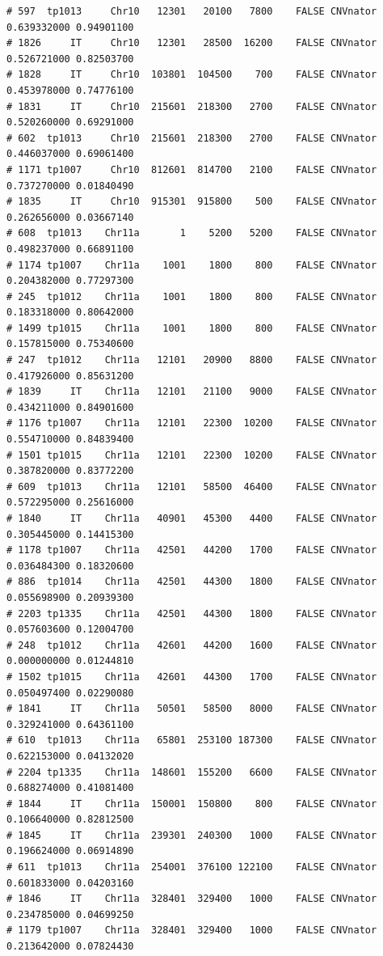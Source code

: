 \documentclass{article}\usepackage[]{graphicx}\usepackage[]{color}
\makeatletter
\newenvironment{kframe}{%
 \def\at@end@of@kframe{}%
 \ifinner\ifhmode%
  \def\at@end@of@kframe{\end{minipage}}%
  \begin{minipage}{\columnwidth}%
 \fi\fi%
 \def\FrameCommand##1{\hskip\@totalleftmargin \hskip-\fboxsep
 \colorbox{shadecolor}{##1}\hskip-\fboxsep
     \hskip-\linewidth \hskip-\@totalleftmargin \hskip\columnwidth}%
 \MakeFramed {\advance\hsize-\width
   \@totalleftmargin\z@ \linewidth\hsize
   \@setminipage}}%
 {\par\unskip\endMakeFramed%
 \at@end@of@kframe}
\newenvironment{knitrout}{}{} %
\makeatother
\begin{document}
\begin{knitrout}
\begin{kframe}
\begin{verbatim}
# 597  tp1013     Chr10   12301   20100   7800    FALSE CNVnator 0.639332000 0.94901100
# 1826     IT     Chr10   12301   28500  16200    FALSE CNVnator 0.526721000 0.82503700
# 1828     IT     Chr10  103801  104500    700    FALSE CNVnator 0.453978000 0.74776100
# 1831     IT     Chr10  215601  218300   2700    FALSE CNVnator 0.520260000 0.69291000
# 602  tp1013     Chr10  215601  218300   2700    FALSE CNVnator 0.446037000 0.69061400
# 1171 tp1007     Chr10  812601  814700   2100    FALSE CNVnator 0.737270000 0.01840490
# 1835     IT     Chr10  915301  915800    500    FALSE CNVnator 0.262656000 0.03667140
# 608  tp1013    Chr11a       1    5200   5200    FALSE CNVnator 0.498237000 0.66891100
# 1174 tp1007    Chr11a    1001    1800    800    FALSE CNVnator 0.204382000 0.77297300
# 245  tp1012    Chr11a    1001    1800    800    FALSE CNVnator 0.183318000 0.80642000
# 1499 tp1015    Chr11a    1001    1800    800    FALSE CNVnator 0.157815000 0.75340600
# 247  tp1012    Chr11a   12101   20900   8800    FALSE CNVnator 0.417926000 0.85631200
# 1839     IT    Chr11a   12101   21100   9000    FALSE CNVnator 0.434211000 0.84901600
# 1176 tp1007    Chr11a   12101   22300  10200    FALSE CNVnator 0.554710000 0.84839400
# 1501 tp1015    Chr11a   12101   22300  10200    FALSE CNVnator 0.387820000 0.83772200
# 609  tp1013    Chr11a   12101   58500  46400    FALSE CNVnator 0.572295000 0.25616000
# 1840     IT    Chr11a   40901   45300   4400    FALSE CNVnator 0.305445000 0.14415300
# 1178 tp1007    Chr11a   42501   44200   1700    FALSE CNVnator 0.036484300 0.18320600
# 886  tp1014    Chr11a   42501   44300   1800    FALSE CNVnator 0.055698900 0.20939300
# 2203 tp1335    Chr11a   42501   44300   1800    FALSE CNVnator 0.057603600 0.12004700
# 248  tp1012    Chr11a   42601   44200   1600    FALSE CNVnator 0.000000000 0.01244810
# 1502 tp1015    Chr11a   42601   44300   1700    FALSE CNVnator 0.050497400 0.02290080
# 1841     IT    Chr11a   50501   58500   8000    FALSE CNVnator 0.329241000 0.64361100
# 610  tp1013    Chr11a   65801  253100 187300    FALSE CNVnator 0.622153000 0.04132020
# 2204 tp1335    Chr11a  148601  155200   6600    FALSE CNVnator 0.688274000 0.41081400
# 1844     IT    Chr11a  150001  150800    800    FALSE CNVnator 0.106640000 0.82812500
# 1845     IT    Chr11a  239301  240300   1000    FALSE CNVnator 0.196624000 0.06914890
# 611  tp1013    Chr11a  254001  376100 122100    FALSE CNVnator 0.601833000 0.04203160
# 1846     IT    Chr11a  328401  329400   1000    FALSE CNVnator 0.234785000 0.04699250
# 1179 tp1007    Chr11a  328401  329400   1000    FALSE CNVnator 0.213642000 0.07824430

\end{verbatim}
\end{kframe}
\end{knitrout}
\end{document}
